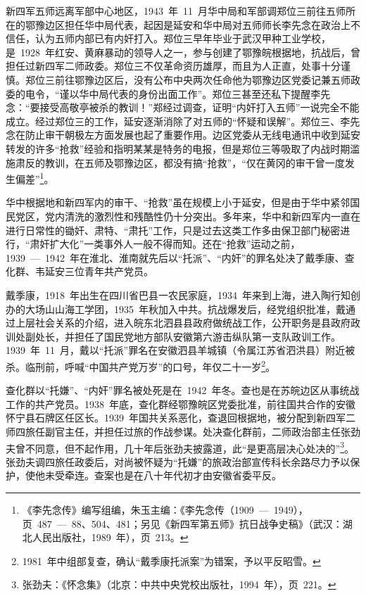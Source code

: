 新四军五师远离军部中心地区，1943~年~11~月华中局和军部调郑位三前往五师所在的鄂豫边区担任华中局代表，起因是延安和华中局对五师师长李先念在政治上不信任，认为五师内部已有内奸打入。郑位三早年毕业于武汉甲种工业学校，是~1928~年红安、黄麻暴动的领导人之一，参与创建了鄂豫皖根据地，抗战后，曾担任过新四军二师政委。郑位三不仅革命资历雄厚，而且为人正直，处事十分谨慎。郑位三前往鄂豫边区后，没有公布中央两次任命他为鄂豫边区党委记兼五师政委的电令，“谨以华中局代表的身份出面工作”。郑位三甚至还私下提醒李先念：“要接受高敬亭被杀的教训！”郑经过调查，证明“内奸打入五师”一说完全不能成立。经过郑位三的工作，延安逐渐消除了对五师的“怀疑和误解”。郑位三、李先念在防止审干朝极左方面发展也起了重要作用。边区党委从无线电通讯中收到延安转发的许多“抢救”经验和指明某某是特务的电报，但是郑位三等吸取了内战时期滥施肃反的教训，在五师及鄂豫边区，都没有搞“抢救”，“仅在黄冈的审干曾一度发生偏差”\footnote{《李先念传》编写组编，朱玉主编：《李先念传（1909~—~1949），页~487~—~88、504、481；另见《新四军第五师》抗日战争史稿》（武汉：湖北人民出版社，1989~年），页~213。}。

华中根据地和新四军内的审干、“抢救”虽在规模上小于延安，但是由于华中紧邻国民党区，党内清洗的激烈性和残酷性仍十分突出。多年来，华中和新四军内一直在进行日常性的锄奸、肃特、“肃托”工作，只是过去这类工作多由保卫部门秘密进行，“肃奸扩大化”一类事外人一般不得而知。还在“抢救”运动之前，1939~—~1942~年在淮北、淮南就先后以“托派”、“内奸”的罪名处决了戴季康、查化群、韦延安三位青年共产党员。

戴季康，1918~年出生在四川省巴县一农民家庭，1934~年来到上海，进入陶行知创办的大场山山海工学团，1935~年秋加入中共。抗战爆发后，经党组织批准，戴通过上层社会关系的介绍，进入皖东北泗县县政府做统战工作，公开职务是县政府政训处副处长，并担任了国民党地方部队安徽第六游击纵队第一支队政训工作。1939~年~11~月，戴以“托派”罪名在安徽泗县羊城镇（令属江苏省泗洪县）附近被杀。临刑前，呼喊“中国共产党万岁”的口号，年仅二十一岁\footnote{1981~年中组部复查，确认“戴季康托派案”为错案，予以平反昭雪。}。

查化群以“托嫌”、“内奸”罪名被处死是在~1942~年冬。查也是在苏皖边区从事统战工作的共产党员。1938~年底，查化群经鄂豫皖区党委批准，前往国共合作的安徽怀宁县石牌区任区长。1939~年国共关系恶化，查退回根据地，被分配到新四军二师四旅任副官主任，并担任过旅的作战参谋。处决查化群前，二师政治部主任张劲夫曾不同意，但不起作用，几十年后张劲夫披露道，此“是更高层决心处决的”\footnote{张劲夫：《怀念集》（北京：中共中央党校出版社，1994~年），页~221。}。张劲夫调四旅任政委后，对尚被怀疑为“托嫌”的旅政治部宣传科长余路尽力予以保护，使他未受牵连。查案也是在八十年代初才由安徽省委平反。

